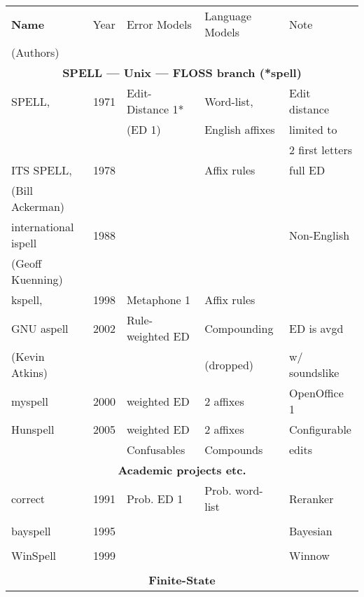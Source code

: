 \documentclass[officiallayout]{unihelcompling}
\begin{document}
\begin{table}
    \centering
    \begin{tabular}{|l|r|l|l|l|}
        \hline
        \bf Name & Year & Error Models & Language Models & Note \\
(Authors) & & & & \\
        \hline
        \multicolumn{5}{|c|}{\bf SPELL --- Unix --- FLOSS branch (*spell) }\\
        \hline
             SPELL, & 1971 & Edit-Distance 1* & Word-list, & Edit distance \\
        \citep{gorin1971spell} &  & (ED 1) & English affixes & limited to \\
                                  &  & &              & 2 first letters \\
        ITS SPELL, & 1978 &  & Affix rules & full ED \\
     (Bill Ackerman) & & & & \\
        international ispell & 1988 & & & Non-English \\
              (Geoff Kuenning) & & & & \\
        \hline
        kspell, & 1998 & Metaphone 1 & Affix rules & \\
        GNU aspell & 2002 & Rule-weighted ED & Compounding & ED is avgd \\
    (Kevin Atkins) & & & (dropped) & w/ soundslike \\
        \hline
        myspell & 2000 & weighted ED & 2 affixes & OpenOffice 1 \\
        \hline
        Hunspell & 2005 & weighted ED & 2 affixes & Configurable \\
                 &      & Confusables & Compounds & edits \\
        \hline
        \multicolumn{5}{|c|}{\bf Academic projects etc.} \\
        \hline
        correct & 1991 & Prob. ED 1 & Prob. word-list & Reranker \\
        \citep{church1991probability} & & & & \\
        \hline
        bayspell  & 1995 & & & Bayesian \\
        \citep{golding1995bayesian} & & & & \\
        \hline
        WinSpell & 1999 & & & Winnow \\
        \citep{golding1999winnow} & & & & \\
        \hline
        \multicolumn{5}{|c|}{\bf Finite-State} \\

\end{tabular}
\end{table}
\end{document}
